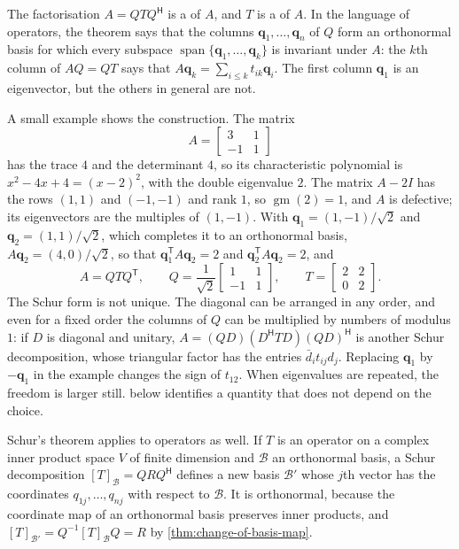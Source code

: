 The factorisation $A=QTQ^{\mathsf H}$ is a  of $A$, and $T$ is a  of $A$. In the language of operators, the theorem says that the columns $\mathbf q_1,\ldots,\mathbf q_n$ of $Q$ form an orthonormal basis for which every subspace $\operatorname{span}\{\mathbf q_1,\ldots,\mathbf q_k\}$ is invariant under $A$: the $k$th column of $AQ=QT$ says that $A\mathbf q_k=\sum_{i\le k}t_{ik}\mathbf q_i$. The first column $\mathbf q_1$ is an eigenvector, but the others in general are not.

A small example shows the construction. The matrix
\begin{equation}
A=\begin{bmatrix}3&1\\-1&1\end{bmatrix}
\label{eq:schur-example}
\end{equation}
has the trace $4$ and the determinant $4$, so its characteristic polynomial is $x^2-4x+4=(x-2)^2$, with the double eigenvalue $2$. The matrix $A-2I$ has the rows $(1,1)$ and $(-1,-1)$ and rank $1$, so $\operatorname{gm}(2)=1$, and $A$ is defective; its eigenvectors are the multiples of $(1,-1)$. With $\mathbf q_1=(1,-1)/\sqrt2$ and $\mathbf q_2=(1,1)/\sqrt2$, which completes it to an orthonormal basis, $A\mathbf q_2=(4,0)/\sqrt2$, so that $\mathbf q_1^{\mathsf T}A\mathbf q_2=2$ and $\mathbf q_2^{\mathsf T}A\mathbf q_2=2$, and
\[
A=QTQ^{\mathsf T},\qquad Q=\frac1{\sqrt2}\begin{bmatrix}1&1\\-1&1\end{bmatrix},\qquad T=\begin{bmatrix}2&2\\0&2\end{bmatrix}.
\]
The Schur form is not unique. The diagonal can be arranged in any order, and even for a fixed order the columns of $Q$ can be multiplied by numbers of modulus $1$: if $D$ is diagonal and unitary, $A=(QD)(D^{\mathsf H}TD)(QD)^{\mathsf H}$ is another Schur decomposition, whose triangular factor has the entries $\bar d_it_{ij}d_j$. Replacing $\mathbf q_1$ by $-\mathbf q_1$ in the example changes the sign of $t_{12}$. When eigenvalues are repeated, the freedom is larger still.  below identifies a quantity that does not depend on the choice.

Schur's theorem applies to operators as well. If $T$ is an operator on a complex inner product space $V$ of finite dimension and $\mathcal B$ an orthonormal basis, a Schur decomposition $[T]_{\mathcal B}=QRQ^{\mathsf H}$ defines a new basis $\mathcal B'$ whose $j$th vector has the coordinates $q_{1j},\ldots,q_{nj}$ with respect to $\mathcal B$. It is orthonormal, because the coordinate map of an orthonormal basis preserves inner products, and $[T]_{\mathcal B'}=Q^{-1}[T]_{\mathcal B}Q=R$ by \cref{thm:change-of-basis-map}.

